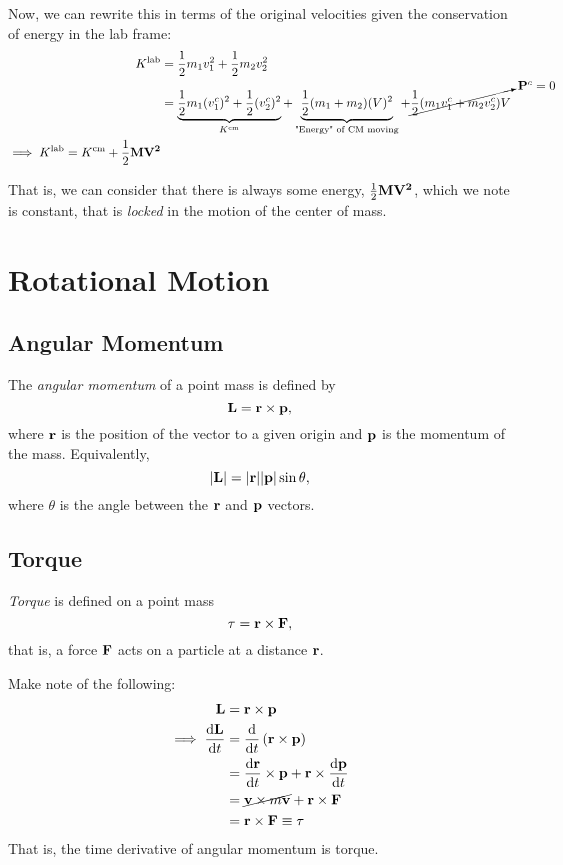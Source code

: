 \documentclass[12pt]{article}
\begin{document}
Now, we can rewrite this in terms of the original velocities given the conservation of energy in the lab frame:
\begin{align*}
  K^{\text{lab}} &= \frac{1}{2}m_1 v_1^2 + \frac{1}{2}m_2 v_2^2\\
  &= \underbrace{\frac{1}{2}m_1 (v_1^c)^2 + \frac{1}{2} (v_2^c)^2}_{K^{\text{cm}}} + \underbrace{\frac{1}{2}(m_1 + m_2)(V)^2}_{\text{"Energy" of CM moving}} + \cancelto{\vb{P}^c = 0}{\frac{1}{2}(m_1 v_1^c + m_2 v_2^c)V}\\
  \implies K^\text{lab} = K^\text{cm} + \frac{1}{2}\bf{M} \vb{V}^2
\end{align*}

That is, we can consider that there is always some energy, $\frac{1}{2}\bf{M}\vb{V}^2$, which we note is constant, that is \textit{locked} in the motion of the center of mass.


\section{Rotational Motion}

\subsection{Angular Momentum}

\begin{definition}
  The \emph{angular momentum} of a point mass is defined by \[
    \vb{L} = \vb{r} \times \vb{p},  
  \]
  where $\vb{r}$ is the position of the vector to a given origin and $\vb{p}$ is the momentum of the mass. Equivalently, \[
  |\vb{L}|  = |\vb{r}||\vb{p}|\sin \theta,
  \]
  where $\theta$ is the angle between the $\vb{r}$ and $\vb{p}$ vectors.
\end{definition}


\subsection{Torque}

\begin{definition}[Torque]
  \emph{Torque} is defined on a point mass \[
    \vb{\tau} = \vb{r} \times \vb{F},
    \]
    that is, a force $\vb{F}$ acts on a particle at a distance $\vb{r}$.
\end{definition}


Make note of the following:
\begin{align*}
  \vb{L} &= \vb{r} \times \vb{p}\\
  \implies \dv{\vb{L}}{t} &= \dv{t}\left(\vb{r} \times \vb{p}\right)\\
  &= \dv{\vb{r}}{t} \times \vb{p} + \vb{r} \times \dv{\vb{p}}{t}\\
  &= \cancel{\vb{v} \times m \vb{v}} + \vb{r} \times \vb{F}\\
  &= \vb{r} \times \vb{F} \equiv \vb{\tau}
\end{align*}
That is, the time derivative of angular momentum is torque.
\end{document}
